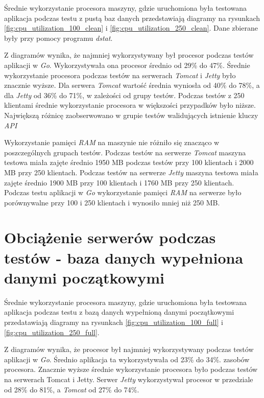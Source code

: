 Średnie wykorzystanie procesora maszyny, gdzie uruchomiona była testowana aplikacja podczas testu z pustą baz danych przedstawiają diagramy na rysunkach \ref{fig:cpu_utilization_100_clean} i \ref{fig:cpu_utilization_250_clean}. Dane zbierane były przy pomocy programu \textsl{dstat}.

Z diagramów wynika, że najmniej wykorzystywany był procesor  podczas testów aplikacji w \textsl{Go}. Wykorzystywała ona procesor średnio od 29\% do 47\%. Średnie wykorzystanie procesora podczas testów na serwerach \textsl{Tomcat} i \textsl{Jetty} było znacznie wyższe. Dla serwera \textsl{Tomcat} wartość średnia wyniosła od 40\% do 78\%, a dla  \textsl{Jetty} od 36\% do 71\%,  w zależości od grupy testów. Podczas testów z 250 klientami średnie wykorzystanie procesora w większości przypadków było niższe. Największą różnicę zaobserwowano w grupie testów walidujących istnienie kluczy \textsl{API}

 Wykorzystanie pamięci \textsl{RAM} na maszynie nie różniło się  znacząco  w poszczególnych grupach testów. Podczas testów na serwerze \textsl{Tomcat} maszyna testowa miała  zajęte średnio 1950 MB podczas testów  przy 100 klientach i 2000 MB przy 250 klientach. Podczas testów na serwerze \textsl{Jetty} maszyna testowa miała zajęte średnio 1900 MB przy 100 klientach  i 1760 MB przy 250 klientach. Podczas testu aplikacji w \textsl{Go} wykorzystanie pamięci \textsl{RAM} na serwerze było porównywalne przy 100 i 250 klientach i wynosiło mniej niż 250 MB. 

% 

\section{Obciążenie serwerów podczas testów - baza danych wypełniona danymi początkowymi}

Średnie wykorzystanie procesora maszyny, gdzie uruchomiona była testowana aplikacja podczas testu z bazą danych wypełnioną danymi początkowymi przedatawiają diagramy 
na rysunkach \ref{fig:cpu_utilization_100_full} i \ref{fig:cpu_utilization_250_full}. 

Z diagramów wynika, że procesor był najmniej wykorzystywany podczas testów aplikacji w \textsl{Go}. Średnio aplikacja ta  wykorzystywała od 23\% do 34\%. zasobów procesora. Znacznie wyższe średnie wykorzystanie procesora było podczas testów na serwerach Tomcat i Jetty. Serwer \textsl{Jetty} wykorzystywał procesor w przedziale od 28\% do 81\%, a \textsl{Tomcat} od 27\% do 74\%.

